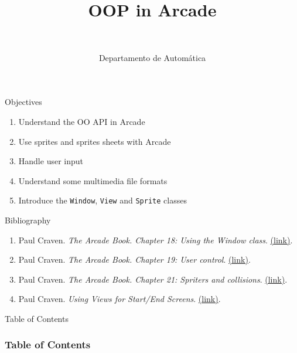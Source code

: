 \documentclass[10pt,compress]{beamer} %
\title{OOP in Arcade}
\author{\asignatura\\\carrera}
\institute{}
\date{Departamento de Automática}
\begin{document}
{\titlepageBlue
    \begin{frame}
        \titlepage
    \end{frame}
}

\institute{\asignatura}

\begin{frame}[plain]{}
	\begin{block}{Objectives}
		\begin{enumerate}
		\item Understand the OO API in Arcade
		\item Use sprites and sprites sheets with Arcade
		\item Handle user input
		\item Understand some multimedia file formats
		\item Introduce the \texttt{Window}, \texttt{View} and \texttt{Sprite} classes
		\end{enumerate}
	\end{block}

   	\begin{block}{Bibliography}
      		\begin{enumerate}
			\item Paul Craven. \textit{The Arcade Book. Chapter 18: Using the Window class}. \href{https://learn.arcade.academy/en/latest/chapters/18\_window\_class/window\_class.html}{(link)}.
			\item Paul Craven. \textit{The Arcade Book. Chapter 19: User control}. \href{https://learn.arcade.academy/en/latest/chapters/18\_window\_class/window\_class.html}{(link)}.
			\item Paul Craven. \textit{The Arcade Book. Chapter 21: Spriters and collisions}. \href{https://learn.arcade.academy/en/latest/chapters/21\_sprites\_and\\_collisions/sprites.html}{(link)}.
			\item Paul Craven. \textit{Using Views for Start/End Screens}. \href{https://api.arcade.academy/en/stable/tutorials/views/index.html}{(link)}.
      		\end{enumerate} 
   	\end{block}
\end{frame}

{
\begin{frame}[shrink]{Table of Contents}

 	\frametitle{Table of Contents}
  	\begin{multicols}{2}
  		\tableofcontents
    \end{multicols}

\end{frame}
}
\end{document}

